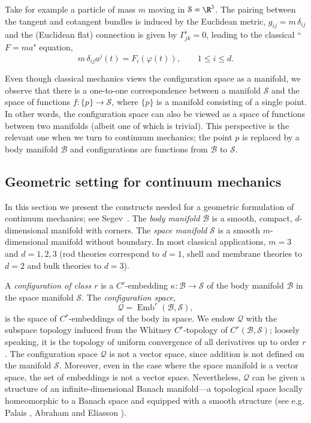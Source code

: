 \documentclass[smallextended]{svjour3}
\begin{document}
Take for example a particle of mass $m$ moving in ${\mathcal{S}} = \R^3$. 
The pairing between the tangent and cotangent bundles is induced by the Euclidean metric, $g_{ij} = m\,\delta_{ij}$ and the (Euclidean flat) connection is given by $\Gamma^i_{jk}= 0$,
leading to the classical ``$F=ma$" equation,
\[
m\, \delta_{ij} a^j(t) =F_i({\varphi}(t)), \qquad 1\le i\le d.
\] 

Even though classical mechanics views the configuration space as a manifold, 
we observe that there is a one-to-one correspondence between a manifold ${\mathcal{S}}$ and the space of functions $f:\{p\}\to {\mathcal{S}}$, where $\{p\}$ is a manifold consisting of a single point. 
In other words, the configuration space can also be viewed as a space of functions between two manifolds (albeit one of which is trivial). 
This perspective is the relevant one when we turn to continuum mechanics; the point ${p}$ is replaced by a body manifold ${\mathcal{B}}$ and configurations are functions from ${\mathcal{B}}$ to ${\mathcal{S}}$. 

\subsection{Geometric setting for continuum mechanics}\label{sec:Geometric}

In this section we present the constructs needed for
a geometric formulation of continuum mechanics; see Segev~\cite{Seg86}.
The  \emph{body manifold} ${\mathcal{B}}$ is a smooth, compact, $d$-dimensional manifold with corners. 
The \emph{space manifold} ${\mathcal{S}}$ is a smooth $m$-dimensional manifold without boundary. In most classical applications, $m=3$ and $d=1,2,3$ (rod theories correspond to $d=1$, shell and membrane theories to $d=2$ and bulk theories to $d=3$).

A \emph{configuration of class $r$} is a $C^r$-embedding $\kappa:{\mathcal{B}}\to{\mathcal{S}}$ of the body manifold ${\mathcal{B}}$ in the space manifold ${\mathcal{S}}$.
The \emph{configuration space},  
\[
{\mathcal{Q}}={\operatorname{Emb}}^r({\mathcal{B}},{\mathcal{S}}),
\] 
is the space of $C^r$-embeddings of the body in space. We endow ${\mathcal{Q}}$ with the subspace topology induced from the Whitney $C^r$-topology of $C^r({\mathcal{B}},{\mathcal{S}})$; loosely speaking, it is the topology of uniform convergence of all derivatives up to order $r$. The configuration space ${\mathcal{Q}}$ is not a vector space, since addition is not defined on the manifold ${\mathcal{S}}$. Moreover, even in the case where the space manifold is a vector space, the set of embeddings is not a vector space. Nevertheless, ${\mathcal{Q}}$ can be given a structure of an infinite-dimensional Banach manifold---a topological space locally homeomorphic to a Banach space and equipped with a smooth structure (see e.g. Palais \cite{Pal68}, Abraham \cite{Abr64} and Eliasson \cite{Eli67}). 
\end{document}

